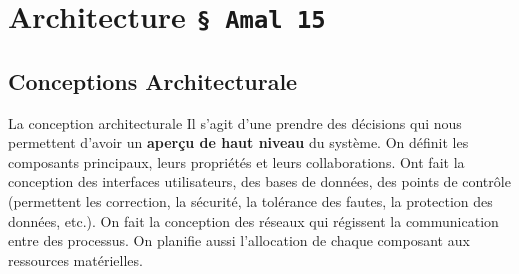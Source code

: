 \documentclass[16pt]{report}
\begin{document}
\begin{multicols*}{2}
\begin{lstlisting}
\end{lstlisting}


\chapter{Architecture \texttt{\S\;  Amal 15}}

        \section{Conceptions Architecturale}

        \begin{Concept}{La conception architecturale}{}
            Il s'agit d'une prendre des décisions qui nous permettent d'avoir un \textbf{aperçu de haut niveau}
            du système. On définit les \textcolor{myb}{composants} principaux, leurs propriétés et leurs collaborations. 
            Ont fait la conception des \textcolor{myb}{interfaces utilisateurs}, des \textcolor{myb}{bases de données},
            des \textcolor{myb}{points de contrôle} (permettent les correction, la sécurité, la tolérance des fautes, 
            la protection des données, etc.). On fait la conception des \textcolor{myb}{réseaux} qui 
            régissent la communication entre des processus. On planifie aussi l'allocation de chaque composant 
            aux \textcolor{myb}{ressources matérielles}.  
        \end{Concept}



\end{multicols*}
\end{document}

